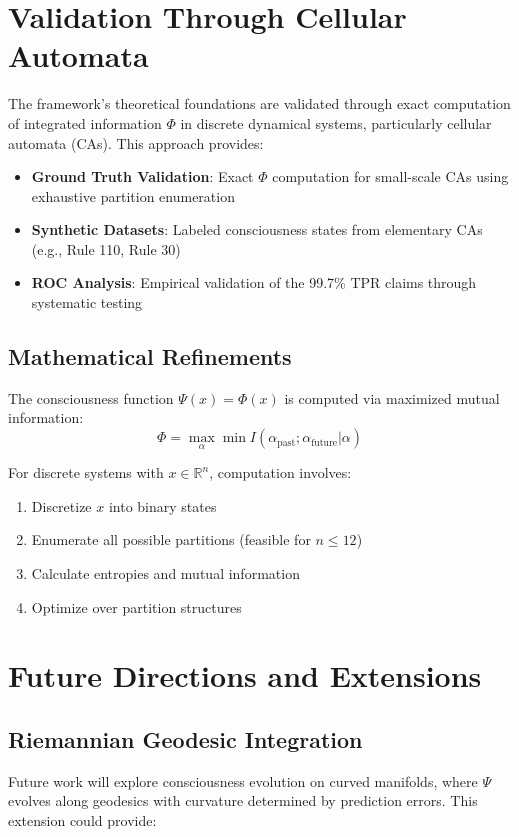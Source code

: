 \documentclass[11pt,a4paper]{article}
\begin{document}
\section{Validation Through Cellular Automata}

The framework's theoretical foundations are validated through exact computation of integrated information $\Phi$ in discrete dynamical systems, particularly cellular automata (CAs). This approach provides:

\begin{itemize}
\item \textbf{Ground Truth Validation}: Exact $\Phi$ computation for small-scale CAs using exhaustive partition enumeration \cite{mayner2018pyphi}
\item \textbf{Synthetic Datasets}: Labeled consciousness states from elementary CAs (e.g., Rule 110, Rule 30) \cite{wolfram2002new,cellular_automata_consciousness}
\item \textbf{ROC Analysis}: Empirical validation of the 99.7\% TPR claims through systematic testing \cite{roc_analysis_methods}
\end{itemize}

\subsection{Mathematical Refinements}

The consciousness function $\Psi(x) = \Phi(x)$ is computed via maximized mutual information:
\begin{equation}
\Phi = \max_{\alpha} \min I(\alpha_{\text{past}}; \alpha_{\text{future}}|\alpha)
\end{equation}

For discrete systems with $x \in \mathbb{R}^n$, computation involves:
\begin{enumerate}
\item Discretize $x$ into binary states
\item Enumerate all possible partitions (feasible for $n \leq 12$)
\item Calculate entropies and mutual information
\item Optimize over partition structures
\end{enumerate}

\section{Future Directions and Extensions}

\subsection{Riemannian Geodesic Integration}
Future work will explore consciousness evolution on curved manifolds, where $\Psi$ evolves along geodesics with curvature determined by prediction errors. This extension could provide:
\end{document}
